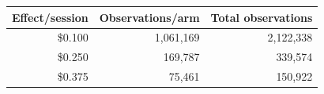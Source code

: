 \begin{tabular}{rrr}
\toprule
Effect/session & Observations/arm & Total observations \\
\midrule
\$0.100 & 1,061,169 & 2,122,338 \\
\$0.250 & 169,787 & 339,574 \\
\$0.375 & 75,461 & 150,922 \\
\bottomrule
\end{tabular}
